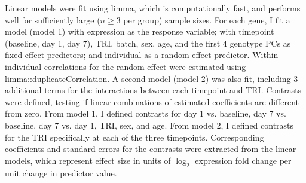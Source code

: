 Linear models were fit using limma\autocite{ritchie2015LimmaPowersDifferential}, which is computationally fast, and performs well for sufficiently large ($n \ge 3$ per group) sample sizes\autocite{soneson2013ComparisonMethodsDifferential}.
For each gene, I fit a model (model 1) with expression as the response variable; with timepoint (baseline, day 1, day 7), \gls{TRI}, batch, sex, age, and the first 4 genotype \glspl{PC} as fixed-effect predictors; and individual as a random-effect predictor.
Within-individual correlations for the random effect were estimated using limma::duplicateCorrelation.
A second model (model 2) was also fit, including 3 additional terms for the interactions between each timepoint and \gls{TRI}.
%
Contrasts were defined, testing if linear combinations of estimated coefficients are different from zero.
From model 1, I defined contrasts for day 1 vs. baseline, day 7 vs. baseline, day 7 vs. day 1, \gls{TRI}, sex, and age.
From model 2, I defined contrasts for the \gls{TRI} specifically at each of the three timepoints.
%
Corresponding coefficients and standard errors for the contrasts were extracted from the linear models, which represent effect size in units of $\log_2$ expression fold change per unit change in predictor value.

